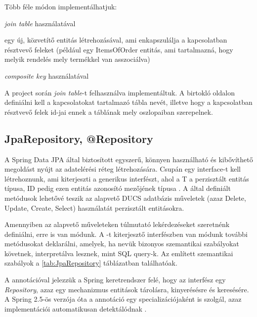 Több féle módon implementálhatjuk: 

\begin{listing}
	\item \emph{join table} használatával
	\item egy új, közvetítő entitás létrehozásával, ami enkapszulálja a kapcsolatban résztvevő feleket (például egy ItemsOfOrder entitás, ami tartalmazná, hogy melyik rendelés mely termékkel van asszociálva)
	\item \emph{composite key} használatával
\end{listing}

A project során \emph{join table}-t felhasználva implementáltuk. A birtokló oldalon definiálni kell a kapcsolatokat tartalmazó tábla nevét, illetve hogy a kapcsolatban résztvevő felek id-jai ennek a táblának mely oszlopaiban szerepelnek. \par


\subsection{JpaRepository, @Repository}

A Spring Data JPA által biztosított  egyszerű, könnyen használható és kibővíthető megoldást nyújt az adatelérési réteg létrehozására. Csupán egy interface-t kell létrehoznunk, ami kiterjeszti a  generikus interfészt, ahol a T a perzisztált entitás típusa, ID pedig ezen entitás azonosító mezőjének típusa \cite{jpaRepositoryDocumentation}. A  által definiált metódusok lehetővé teszik az alapvető  DUCS adatbázis műveletek (azaz Delete, Update, Create, Select) használatát perzisztált entitásokra. \par

Amennyiben az alapvető műveleteken túlmutató lekérdezéseket szeretnénk definiálni, erre is van módunk. A -t kiterjesztő interfészben van módunk további metódusokat deklarálni, amelyek, ha nevük bizonyos szemantikai szabályokat követnek, interpretálva lesznek, mint SQL query-k. Az említett szemantikai szabályok a \ref{tab:JpaRepository} táblázatban találhatóak. \par

A  annotációval jelezzük a Spring keretrendszer felé, hogy az interfész egy \emph{Repository}, azaz egy mechanizmus entitások tárolásra, kinyerésésre és keresésére. A Spring 2.5-ös verzója óta a  annotáció egy specializációjaként is szolgál, azaz implementációi automatikusan detektálódnak \cite{repositoryDocumentation}.

